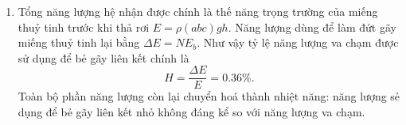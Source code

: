 \begin{enumerate}[label=(\alph*)]
    Với $n=N_A$, năng lượng cần để hoá hơi toàn bộ $1mol$ khối chất phải thoả mãn \begin{equation}M_{SiO_2}\times 1mol\times L=\frac{1}{2}N_A AE_b=3N_A E_b.\end{equation} Từ đó tính được \begin{equation}E_b\approx 3.3\times 10^{-19}\text{J/liên kết}.\end{equation}
    \item Tổng năng lượng hệ nhận được chính là thế năng trọng trường của miếng thuỷ tinh trước khi thả rơi \(E=\rho (abc)gh.\) Năng lượng dùng để làm đứt gãy miếng thuỷ tinh lại bằng \(\Delta E=NE_b.\) Như vậy tỷ lệ năng lượng va chạm được sử dụng để bẻ gãy liên kết chính là \begin{equation}H=\frac{\Delta E}{E}=0.36\%.\end{equation} Toàn bộ phần năng lượng còn lại chuyển hoá thành nhiệt năng: năng lượng sẻ dụng để bẻ gãy liên kết nhỏ không đáng kể so với năng lượng va chạm.
\end{enumerate}
